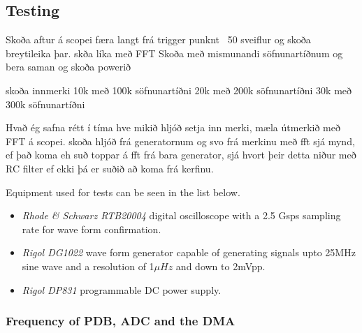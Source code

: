 \subsection{Testing}



Skoða aftur á scopei færa langt frá trigger punknt ~50 sveiflur og skoða breytileika þar.
skða líka með FFT
Skoða með mismunandi söfnunartíðnum og bera saman og skoða powerið

skoða innmerki  10k með 100k söfnunartíðni
                20k með 200k söfnunartíðni
                30k með 300k söfnunartíðni

Hvað ég safna rétt í tíma
hve mikið hljóð
setja inn merki, mæla útmerkið með FFT á scopei.
skoða hljóð frá generatornum og svo frá merkinu með fft
sjá mynd, ef það koma eh suð toppar á fft frá bara generator, sjá hvort þeir detta niður með RC filter ef ekki þá er suðið að koma frá kerfinu.





Equipment used for tests can be seen in the list below.
\begin{itemize}
    \item \textit{Rhode \& Schwarz RTB20004} digital oscilloscope with a 2.5 Gsps sampling rate for wave form confirmation.
    \item \textit{Rigol DG1022} wave form generator capable of generating signals upto 25MHz sine wave and a resolution of 1$\mu Hz$ and down to 2mVpp.
    \item \textit{Rigol DP831} programmable DC power supply.
\end{itemize}



\subsubsection{Frequency of PDB, ADC and the DMA}

